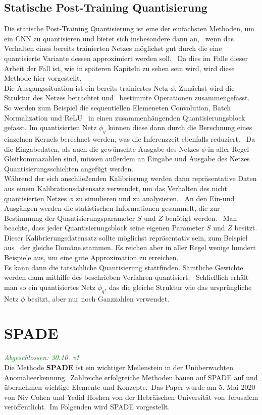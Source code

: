 \subsection{Statische Post-Training Quantisierung}\label{subsec:StatischePostTrainingQuantisierung}
Die statische Post-Training Quantisierung ist eine der einfachsten Methoden, um ein CNN zu quantisieren und bietet sich insbesondere dann an, \
wenn das Verhalten eines bereits trainierten Netzes möglichst gut durch die eine quantisierte Variante dessen approximiert werden soll. \
Da dies im Falle dieser Arbeit der Fall ist, wie in späteren Kapiteln zu sehen sein wird, wird diese Methode hier vorgestellt. \\
Die Ausgangssituation ist ein bereits trainiertes Netz $\phi$. Zunächst wird die Struktur des Netzes betrachtet und \ 
bestimmte Operationen zusammengefasst. So werden zum Beispiel die sequentiellen Elemeneten \glqq Convolution\grqq{}, \glqq Batch Normalization\grqq{} und \glqq ReLU\grqq{} \ 
in einen zusammenhängenden \glqq Quantisierungsblock\grqq{} gefasst. Im quantisierten Netz $\phi_{q}$ können diese dann durch die Berechnung eines einzelnen Kernels berechnet werden, was die Inferenzzeit ebenfalls reduziert. \
Da die Eingabedaten, als auch die gewünschte Ausgabe des Netzes $\phi$ in aller Regel Gleitkommazahlen sind, müssen außerdem an Eingabe und Ausgabe des Netzes Quantisierungsschichten angefügt werden. \\
Während der sich anschließenden Kalibrierung werden dann repräsentative Daten aus einem Kalibrationsdatensatz verwendet, um das Verhalten des nicht quantisierten Netzes $\phi$ zu simulieren und zu analysieren. \
An den Ein-und Ausgängen werden die statistischen Informationen gesammelt, die zur Bestimmung der Quantisierungsparameter $S$ und $Z$ benötigt werden. \
Man beachte, dass jeder Quantisierungsblock seine eigenen Parameter $S$ und $Z$ besitzt. Dieser Kalibrierungsdatensatz sollte möglichst repräsentativ sein, zum Beispiel aus \ 
der gleiche Domäne stammen. Es reichen aber in aller Regel wenige hundert Beispiele aus, um eine gute Approximation zu erreichen. \\
Es kann dann die tatsächliche Quantisierung stattfinden. Sämtliche Gewichte werden dann mithilfe des beschrieben Verfahren quantisiert. \
Schließlich erhält man so ein quantisiertes Netz $\phi_{q}$, das die gleiche Struktur wie das ursprüngliche Netz $\phi$ besitzt, aber nur noch Ganzzahlen verwendet. \

\section{SPADE}\label{sec:SPADE}
\textcolor{green}{\textit{Abgeschlossen: 30.10. v1}}\\
Die Methode \textbf{SPADE} ist ein wichtiger Meilenstein in der Unüberwachten Anomalieerkennung.\
Zahlreiche erfolgreiche Methoden bauen auf SPADE auf und übernehmen wichtige Elemente und Konzepte.\
Das Paper wurde am 5. Mai 2020 von Niv Cohen und Yedid Hoshen von der Hebräischen Universität von Jerusalem veröffentlicht.\
Im Folgenden wird SPADE vorgestellt.\
